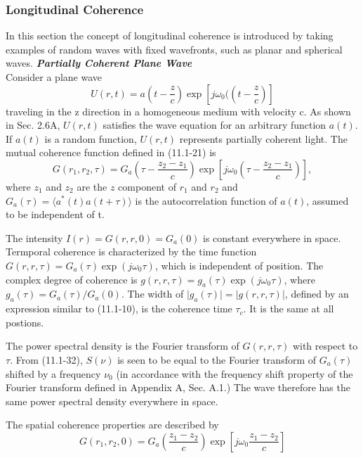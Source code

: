 \documentclass{article}
\numberwithin{figure}{subsection}
\numberwithin{table}{subsection}
\begin{document}
\subsubsection{Longitudinal Coherence}
\endgroup
In this section the concept of longitudinal coherence is introduced by taking examples of random waves with fixed wavefronts, such as planar and spherical waves.
\bigbreak\noindent\textcolor{ksc}{\textbf{\textsl{Partially Coherent Plane Wave}}}\\
Consider a plane wave
\begin{equation}
U(r, t) = a (t - \frac{z}{c}) \exp[j\omega_0 ((t - \frac{z}{c})]
\end{equation}
traveling in the z direction in a homogeneous medium with velocity c. As shown in Sec. 2.6A, $ U(r,t) $ satisfies the wave equation for an arbitrary function $ a(t) $. If  $ a(t) $ is a random function,  $ U(r,t) $ represents partially coherent light. The mutual coherence function defined in (11.1-21) is
\begin{equation}
G(r_1, r_2, \tau) = G_a (\tau - \frac{z_2 - z_1}{c}) \exp [j\omega_0 (\tau - \frac{z_2 - z_1}{c})] ,
\end{equation}
where $ z_1 $ and $ z_2 $ are the $ z $ component of $ r_1 $ and $ r_2 $ and $ G_a (\tau) = \langle a^\ast (t) a(t + \tau) \rangle $ is the autocorrelation function of $ a(t) $, assumed to be independent of t.
\par The intensity $ I(r) = G(r, r, 0) = G_a (0) $ is constant everywhere in space. Termporal coherence is characterized by the time function $ G(r, r, \tau) = G_a (\tau) \exp (j\omega_0 \tau) $, which is independent of position. The complex degree of coherence is $ g(r, r, \tau) = g_a (\tau) \exp(j\omega_0 \tau) $, where $ g_a (\tau) = G_a (\tau) / G_a (0) $. The width of $ \lvert g_a (\tau) \rvert = \lvert g(r, r, \tau) \rvert $, defined by an expression similar to (11.1-10), is the coherence time $ \tau_c $. It is the same at all postions.
\par The power spectral density is the Fourier transform of $ G(r, r, \tau) $ with respect to $ \tau $. From (11.1-32), $ S(\nu) $ is seen to be equal to the Fourier transform of $ G_a (\tau) $ shifted by a frequency $ \nu_0 $ (in accordance with the frequency shift property of the Fourier transform defined in Appendix A, Sec. A.1.) The wave therefore has the same power spectral density everywhere in space.
\par The spatial coherence properties are described by
\begin{equation}
G(r_1, r_2, 0) = G_a (\frac{z_1 - z_2}{c}) \exp[j\omega_0 \frac{z_1 - z_2}{c}]
\end{equation}
\end{document}
